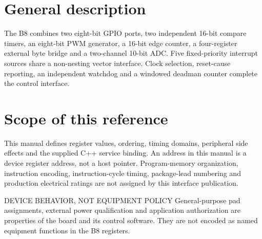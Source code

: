 \documentclass[10pt]{article}
\begin{document}

\section*{General description}
The B8 combines two eight-bit GPIO ports, two independent 16-bit compare timers, an eight-bit PWM generator, a 16-bit edge counter, a four-register external byte bridge and a two-channel 10-bit ADC. Five fixed-priority interrupt sources share a non-nesting vector interface. Clock selection, reset-cause reporting, an independent watchdog and a windowed deadman counter complete the control interface.
\begin{center}
\end{center}
\section*{Scope of this reference}
This manual defines register values, ordering, timing domains, peripheral side effects and the supplied C++ service binding. An address in this manual is a device register address, not a host pointer. Program-memory organization, instruction encoding, instruction-cycle timing, package-lead numbering and production electrical ratings are not assigned by this interface publication.
\begin{Notice}{DEVICE BEHAVIOR, NOT EQUIPMENT POLICY}
General-purpose pad assignments, external power qualification and application authorization are properties of the board and its control software. They are not encoded as named equipment functions in the B8 registers.
\end{Notice}
\end{document}
